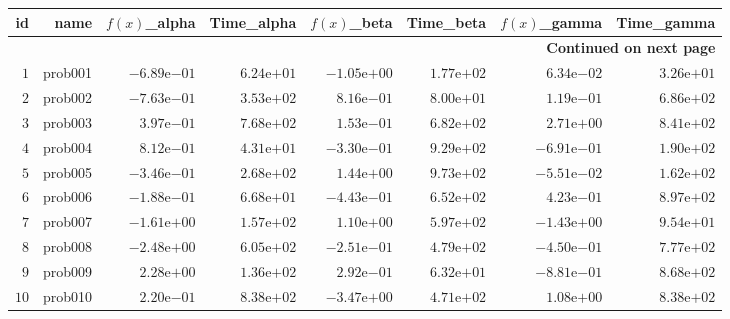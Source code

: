 \documentclass[varwidth=20cm,crop=true]{standalone}
\begin{document}
\begin{longtable}{rrrrrrrr}
\hline
id & name & \(f(x)\)\_alpha & Time\_alpha & \(f(x)\)\_beta & Time\_beta & \(f(x)\)\_gamma & Time\_gamma \\\hline
\endhead
\hline
\multicolumn{8}{r}{{\bfseries Continued on next page}}\\
\hline
\endfoot
\endlastfoot
\(     1\) & prob001 & \(-6.89\)e\(-01\) & \( 6.24\)e\(+01\) & \(-1.05\)e\(+00\) & \( 1.77\)e\(+02\) & \( 6.34\)e\(-02\) & \( 3.26\)e\(+01\) \\
\(     2\) & prob002 & \(-7.63\)e\(-01\) & \( 3.53\)e\(+02\) & \( 8.16\)e\(-01\) & \( 8.00\)e\(+01\) & \( 1.19\)e\(-01\) & \( 6.86\)e\(+02\) \\
\(     3\) & prob003 & \( 3.97\)e\(-01\) & \( 7.68\)e\(+02\) & \( 1.53\)e\(-01\) & \( 6.82\)e\(+02\) & \( 2.71\)e\(+00\) & \( 8.41\)e\(+02\) \\
\(     4\) & prob004 & \( 8.12\)e\(-01\) & \( 4.31\)e\(+01\) & \(-3.30\)e\(-01\) & \( 9.29\)e\(+02\) & \(-6.91\)e\(-01\) & \( 1.90\)e\(+02\) \\
\(     5\) & prob005 & \(-3.46\)e\(-01\) & \( 2.68\)e\(+02\) & \( 1.44\)e\(+00\) & \( 9.73\)e\(+02\) & \(-5.51\)e\(-02\) & \( 1.62\)e\(+02\) \\
\(     6\) & prob006 & \(-1.88\)e\(-01\) & \( 6.68\)e\(+01\) & \(-4.43\)e\(-01\) & \( 6.52\)e\(+02\) & \( 4.23\)e\(-01\) & \( 8.97\)e\(+02\) \\
\(     7\) & prob007 & \(-1.61\)e\(+00\) & \( 1.57\)e\(+02\) & \( 1.10\)e\(+00\) & \( 5.97\)e\(+02\) & \(-1.43\)e\(+00\) & \( 9.54\)e\(+01\) \\
\(     8\) & prob008 & \(-2.48\)e\(+00\) & \( 6.05\)e\(+02\) & \(-2.51\)e\(-01\) & \( 4.79\)e\(+02\) & \(-4.50\)e\(-01\) & \( 7.77\)e\(+02\) \\
\(     9\) & prob009 & \( 2.28\)e\(+00\) & \( 1.36\)e\(+02\) & \( 2.92\)e\(-01\) & \( 6.32\)e\(+01\) & \(-8.81\)e\(-01\) & \( 8.68\)e\(+02\) \\
\(    10\) & prob010 & \( 2.20\)e\(-01\) & \( 8.38\)e\(+02\) & \(-3.47\)e\(+00\) & \( 4.71\)e\(+02\) & \( 1.08\)e\(+00\) & \( 8.38\)e\(+02\) \\\hline
\end{longtable}
\end{document}
